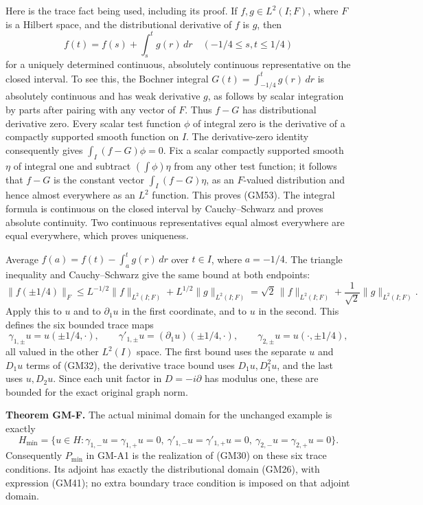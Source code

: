 \documentclass[
  11pt,
]{article}
\begin{document}
Here is the trace fact being used, including its proof. If
\(f,g\in L^2(I;F)\), where \(F\) is a
Hilbert space, and the distributional derivative of
\(f\) is \(g\), then
\[
 f(t)=f(s)+\int_s^t g(r)\,dr
 \quad(-1/4\leq s,t\leq1/4)
 \tag{GM53}
\] for a uniquely determined continuous,
absolutely continuous representative on the closed interval. To see
this, the Bochner integral \(G(t)=\int_{-1/4}^t g(r)\,dr\) is absolutely
continuous and has weak derivative \(g\), as
follows by scalar integration by parts after pairing with any vector of
\(F\). Thus \(f-G\) has
distributional derivative zero. Every scalar test function
\(\phi\) of integral zero is the derivative of a
compactly supported smooth function on \(I\). The
derivative-zero identity consequently gives \(\int_I(f-G)\phi=0\).
Fix a scalar compactly supported smooth \(\eta\) of
integral one and subtract \((\int\phi)\eta\) from any other test
function; it follows that \(f-G\) is the constant
vector \(\int_I(f-G)\eta\), as an
\(F\)-valued distribution and hence almost
everywhere as an \(L^2\) function. This proves
(GM53). The integral formula is continuous on the closed interval by
Cauchy--Schwarz and proves absolute continuity. Two continuous
representatives equal almost everywhere are equal everywhere, which
proves uniqueness.

Average \(f(a)=f(t)-\int_a^t g(r)\,dr\) over \(t\in I\),
where \(a=-1/4\). The triangle inequality and
Cauchy--Schwarz give the same bound at both endpoints:
\[
 \|f(\pm1/4)\|_F
      \leq L^{-1/2}\|f\|_{L^2(I;F)}
           +L^{1/2}\|g\|_{L^2(I;F)}
      =\sqrt2\,\|f\|_{L^2(I;F)}
           +\frac1{\sqrt2}\|g\|_{L^2(I;F)}.
 \tag{GM54}
\] Apply this to \(u\) and
to \(\partial_1u\) in the first coordinate, and to
\(u\) in the second. This defines the six bounded
trace maps \[
 \gamma_{1,\pm}u=u(\pm1/4,\cdot),\qquad
 \gamma'_{1,\pm}u=(\partial_1u)(\pm1/4,\cdot),\qquad
 \gamma_{2,\pm}u=u(\cdot,\pm1/4),
 \tag{GM55}
\] all valued in the other
\(L^2(I)\) space. The first bound uses the separate
\(u\) and \(D_1u\) terms of
(GM32), the derivative trace bound uses \(D_1u,D_1^2u\), and
the last uses \(u,D_2u\). Since each unit factor in
\(D=-i\partial\) has modulus one, these are bounded for the
exact original graph norm.

\textbf{Theorem GM-F.} The actual minimal domain for the unchanged
example is exactly \[
 H_{\min}
  =\{u\in H:
       \gamma_{1,-}u=\gamma_{1,+}u=0,\
       \gamma'_{1,-}u=\gamma'_{1,+}u=0,\
       \gamma_{2,-}u=\gamma_{2,+}u=0\}.
 \tag{GM56}
\] Consequently
\(P_{\min}\) in GM-A1 is the realization of (GM30) on
these six trace conditions. Its adjoint has exactly the distributional
domain (GM26), with expression (GM41); no extra boundary trace condition
is imposed on that adjoint domain.
\end{document}
